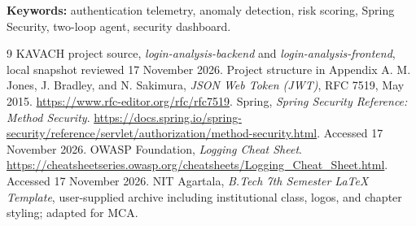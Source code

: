 \documentclass[a4paper,12pt]{nitathesis}
\numberwithin{figure}{chapter}
\begin{document}
\noindent\textbf{Keywords:} authentication telemetry, anomaly detection, risk scoring, Spring Security, two-loop agent, security dashboard.
\clearpage\begingroup\setlength{\parskip}{0pt}\tableofcontents\endgroup
\clearpage{}\pagestyle{fancy}\raggedbottom

\begin{thebibliography}{9}
 KAVACH project source, \emph{login-analysis-backend} and \emph{login-analysis-frontend}, local snapshot reviewed 17 November 2026. Project structure in Appendix A.
 M. Jones, J. Bradley, and N. Sakimura, \emph{JSON Web Token (JWT)}, RFC 7519, May 2015. \url{https://www.rfc-editor.org/rfc/rfc7519}.
 Spring, \emph{Spring Security Reference: Method Security}. \url{https://docs.spring.io/spring-security/reference/servlet/authorization/method-security.html}. Accessed 17 November 2026.
 OWASP Foundation, \emph{Logging Cheat Sheet}. \url{https://cheatsheetseries.owasp.org/cheatsheets/Logging_Cheat_Sheet.html}. Accessed 17 November 2026.
 NIT Agartala, \emph{B.Tech 7th Semester LaTeX Template}, user-supplied archive including institutional class, logos, and chapter styling; adapted for MCA.
\end{thebibliography}
\appendix
\end{document}
